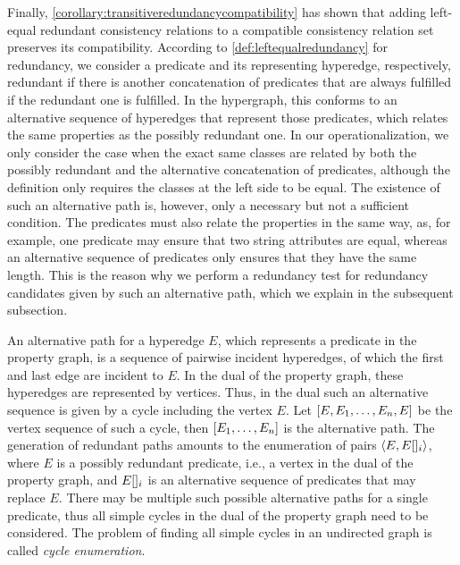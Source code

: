 Finally, \autoref{corollary:transitiveredundancycompatibility} has shown that adding left-equal redundant consistency relations to a compatible consistency relation set preserves its compatibility.
According to \autoref{def:leftequalredundancy} for redundancy, we consider a predicate and its representing hyperedge, respectively, redundant if there is another concatenation of predicates that are always fulfilled if the redundant one is fulfilled.
In the hypergraph, this conforms to an alternative sequence of hyperedges that represent those predicates, which relates the same properties as the possibly redundant one.
In our operationalization, we only consider the case when the exact same classes are related by both the possibly redundant and the alternative concatenation of predicates, although the definition only requires the classes at the left side to be equal.
The existence of such an alternative path is, however, only a necessary but not a sufficient condition.
The predicates must also relate the properties in the same way, as, for example, one predicate may ensure that two string attributes are equal, whereas an alternative sequence of predicates only ensures that they have the same length.
This is the reason why we perform a redundancy test for redundancy candidates given by such an alternative path, which we explain in the subsequent subsection.

An alternative path for a hyperedge $E$, which represents a predicate in the property graph, is a sequence of pairwise incident hyperedges, of which the first and last edge are incident to $E$.
In the dual of the property graph, these hyperedges are represented by vertices.
Thus, in the dual such an alternative sequence is given by a cycle including the vertex $E$.
Let $[E, E_1, \dots, E_n, E]$ be the vertex sequence of such a cycle, then $[E_1, \dots, E_n]$ is the alternative path.
The generation of redundant paths amounts to the enumeration of pairs $\langle E, E[]_i \rangle$, where $E$ is a possibly redundant predicate, i.e., a vertex in the dual of the property graph, and $E[]_i$ is an alternative sequence of predicates that may replace $E$.
There may be multiple such possible alternative paths for a single predicate, thus all simple cycles in the dual of the property graph need to be considered.
The problem of finding all simple cycles in an undirected graph is called \emph{cycle enumeration}.

